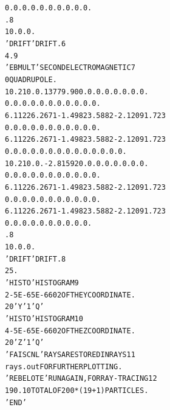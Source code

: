 \begin{tiny}
\begin{center}
\begin{alltt}
  0.  0. 0. 0. 0. 0. 0. 0. 0. 0.                                                 
  .8                                                                             
  1 0. 0. 0.                                                                     
  'DRIFT'                                       DRIFT.                    6      
  4.9                                                                            
  'EBMULT'                                      SECOND ELECTROMAGNETIC    7      
   0                                                             QUADRUPOLE.     
  10.2  10. 0.  13779.90  0. 0. 0. 0. 0. 0. 0. 0.                                
   0.  0.  0.  0.  0.  0.  0. 0. 0. 0. 0.                                        
  6  .1122 6.2671 -1.4982 3.5882 -2.1209 1.723                                   
   0.  0.  0.  0.  0.  0.  0. 0. 0. 0. 0.                                        
  6  .1122 6.2671 -1.4982 3.5882 -2.1209 1.723                                   
  0. 0. 0. 0. 0. 0. 0. 0. 0. 0. 0. 0. 0. 0.                                      
  10.2  10. 0.   -2.81592  0. 0. 0. 0. 0. 0. 0. 0.                               
   0.  0.  0.  0.  0.  0.  0. 0. 0. 0. 0.                                        
  6  .1122 6.2671 -1.4982 3.5882 -2.1209 1.723                                   
   0.  0.  0.  0.  0.  0.  0. 0. 0. 0. 0.                                        
  6  .1122 6.2671 -1.4982 3.5882 -2.1209 1.723                                   
  0. 0. 0. 0. 0. 0. 0. 0. 0. 0.                                                  
  .8                                                                             
  1 0. 0. 0.                                                                     
  'DRIFT'                                       DRIFT.                    8      
  25.                                                                            
  'HISTO'                                       HISTOGRAM                 9      
  2  -5E-6  5E-6     60  2                        OF THE Y COORDINATE.           
  20  'Y'  1  'Q'                                                                
  'HISTO'                                       HISTOGRAM                10      
  4  -5E-6  5E-6     60  2                        OF THE Z COORDINATE.           
  20  'Z'  1  'Q'                                                                
  'FAISCNL'                                     RAYS ARE STORED IN RAYS  11      
  rays.out                                               FOR FURTHER PLOTTING.   
  'REBELOTE'                                    RUN AGAIN, FOR RAY-TRACING  12      
  19  0.1 0                                       TOTAL OF 200*(19+1) PARTICLES. 
  'END'                                                                          



\end{alltt}
\end{center}
\end{tiny}
